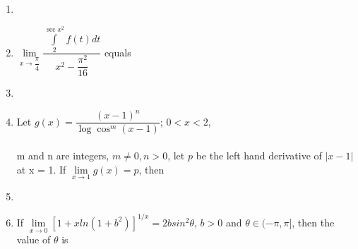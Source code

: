 \begin{enumerate}[label=\arabic*.,ref=\thesubsection.\theenumi]
\item[~] \item $\lim\limits_{x \to \dfrac{\pi}{4}}\dfrac{\int\limits_2^{\sec x^2}f(t) dt}{x^2-\dfrac{\pi ^2}{16}}$ equals \\ 
\begin{itemize}
\end{itemize}

\item[~] \item Let $g(x)=\dfrac{(x-1)^n}{\log\cos^m(x-1)}$; $0<x<2$, \\ \\m and n are integers, $m \ne 0, n>0$, let $p$ be the left hand derivative of $|x-1|$ at x = 1. If $\lim\limits_{x \to 1}g(x)=p$, then
\begin{itemize}
\end{itemize} 

\item[~] \item If $\lim\limits_{x \to 0}\left[1+xln(1+b^2)\right]^{1/x}=2bsin^2\theta$, $b>0$ and $\theta \in (-\pi, \pi]$, then the value of $\theta$ is
\begin{itemize}
\end{itemize}


\end{enumerate}
